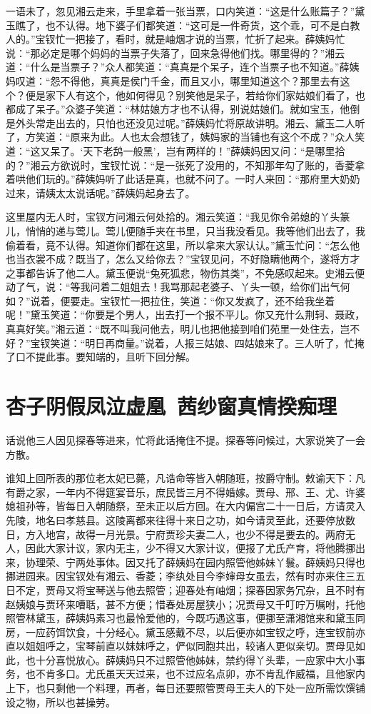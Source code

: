 \documentclass[12pt,oneside]{book}
\begin{document}
一语未了，忽见湘云走来，手里拿着一张当票，口内笑道：“这是什么账篇子？”黛玉瞧了，也不认得。地下婆子们都笑道：“这可是一件奇货，这个乖，可不是白教人的。”宝钗忙一把接了，看时，就是岫烟才说的当票，忙折了起来。薛姨妈忙说：“那必定是哪个妈妈的当票子失落了，回来急得他们找。哪里得的？”湘云道：“什么是当票子？”众人都笑道：“真真是个呆子，连个当票子也不知道。”薛姨妈叹道：“怨不得他，真真是侯门千金，而且又小，哪里知道这个？那里去有这个？便是家下人有这个，他如何得见？别笑他是呆子，若给你们家姑娘们看了，也都成了呆子。”众婆子笑道：“林姑娘方才也不认得，别说姑娘们。就如宝玉，他倒是外头常走出去的，只怕也还没见过呢。”薛姨妈忙将原故讲明。湘云、黛玉二人听了，方笑道：“原来为此。人也太会想钱了，姨妈家的当铺也有这个不成？”众人笑道：“这又呆了。‘天下老鸹一般黑’，岂有两样的！”薛姨妈因又问：“是哪里拾的？”湘云方欲说时，宝钗忙说：“是一张死了没用的，不知那年勾了账的，香菱拿着哄他们玩的。”薛姨妈听了此话是真，也就不问了。一时人来回：“那府里大奶奶过来，请姨太太说话呢。”薛姨妈起身去了。

这里屋内无人时，宝钗方问湘云何处拾的。湘云笑道：“我见你令弟媳的丫头篆儿，悄悄的递与莺儿。莺儿便随手夹在书里，只当我没看见。我等他们出去了，我偷着看，竟不认得。知道你们都在这里，所以拿来大家认认。”黛玉忙问：“怎么他也当衣裳不成？既当了，怎么又给你去？”宝钗见问，不好隐瞒他两个，遂将方才之事都告诉了他二人。黛玉便说“兔死狐悲，物伤其类”，不免感叹起来。史湘云便动了气，说：“等我问着二姐姐去！我骂那起老婆子、丫头一顿，给你们出气何如？”说着，便要走。宝钗忙一把拉住，笑道：“你又发疯了，还不给我坐着呢！”黛玉笑道：“你要是个男人，出去打一个报不平儿。你又充什么荆轲、聂政，真真好笑。”湘云道：“既不叫我问他去，明儿也把他接到咱们苑里一处住去，岂不好？”宝钗笑道：“明日再商量。”说着，人报三姑娘、四姑娘来了。三人听了，忙掩了口不提此事。要知端的，且听下回分解。


 
\chapter{杏子阴假凤泣虚凰~茜纱窗真情揆痴理}
话说他三人因见探春等进来，忙将此话掩住不提。探春等问候过，大家说笑了一会方散。

谁知上回所表的那位老太妃已薨，凡诰命等皆入朝随班，按爵守制。敕谕天下：凡有爵之家，一年内不得筵宴音乐，庶民皆三月不得婚嫁。贾母、邢、王、尤、许婆媳祖孙等，皆每日入朝随祭，至未正以后方回。在大内偏宫二十一日后，方请灵入先陵，地名曰孝慈县。这陵离都来往得十来日之功，如今请灵至此，还要停放数日，方入地宫，故得一月光景。宁府贾珍夫妻二人，也少不得是要去的。两府无人，因此大家计议，家内无主，少不得又大家计议，便报了尤氏产育，将他腾挪出来，协理荣、宁两处事体。因又托了薛姨妈在园内照管他姊妹丫鬟。薛姨妈只得也挪进园来。因宝钗处有湘云、香菱；李纨处目今李婶母女虽去，然有时亦来住三五日不定，贾母又将宝琴送与他去照管；迎春处有岫烟；探春因家务冗杂，且不时有赵姨娘与贾环来嘈聒，甚不方便；惜春处房屋狭小；况贾母又千叮咛万嘱咐，托他照管林黛玉，薛姨妈素习也最怜爱他的，今既巧遇这事，便挪至潇湘馆来和黛玉同房，一应药饵饮食，十分经心。黛玉感戴不尽，以后便亦如宝钗之呼，连宝钗前亦直以姐姐呼之，宝琴前直以妹妹呼之，俨似同胞共出，较诸人更似亲切。贾母见如此，也十分喜悦放心。薛姨妈只不过照管他姊妹，禁约得丫头辈，一应家中大小事务，也不肯多口。尤氏虽天天过来，也不过应名点卯，亦不肯乱作威福，且他家内上下，也只剩他一个料理，再者，每日还要照管贾母王夫人的下处一应所需饮馔铺设之物，所以也甚操劳。
\end{document}
